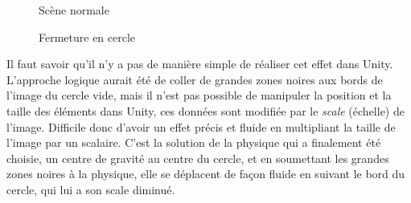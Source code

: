 \begin{figure}[H]\centering
   \begin{minipage}{0.49\textwidth}\centering
     \caption{Scène normale}
     \label{regular_scene}
   \end{minipage}
   \begin {minipage}{0.49\textwidth}\centering
     \caption{Fermeture en cercle}
     \label{cartoon}
   \end{minipage}
\end{figure}

Il faut savoir qu'il n'y a pas de manière simple de réaliser cet effet dans Unity. L'approche logique aurait été de coller de grandes zones noires aux bords de l'image du cercle vide, mais il n'est pas possible de manipuler la position et la taille des éléments dans Unity, ces données sont modifiée par le \textit{scale} (échelle) de l'image. Difficile donc d'avoir un effet précis et fluide en multipliant la taille de l'image par un scalaire. C'est la solution de la physique qui a finalement été choisie, un centre de gravité au centre du cercle, et en soumettant les grandes zones noires à la physique, elle se déplacent de façon fluide en suivant le bord du cercle, qui lui a son scale diminué.

